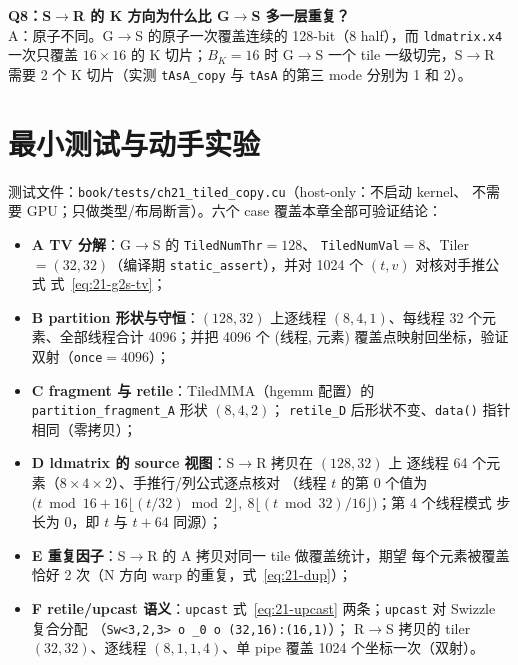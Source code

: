 \textbf{Q8：S$\to$R 的 K 方向为什么比 G$\to$S 多一层重复？}\\
A：原子不同。G$\to$S 的原子一次覆盖连续的 128-bit（8 half），而
\texttt{ldmatrix.x4} 一次只覆盖 $16\times16$ 的 K 切片；$B_K=16$ 时
G$\to$S 一个 tile 一级切完，S$\to$R 需要 2 个 K 切片（实测
\texttt{tAsA\_copy} 与 \texttt{tAsA} 的第三 mode 分别为 1 和 2）。

\section{最小测试与动手实验}

测试文件：\texttt{book/\allowbreak{}tests/\allowbreak{}ch21\_\allowbreak{}tiled\_\allowbreak{}copy.cu}（host-only：不启动 kernel、
不需要 GPU；只做类型/布局断言）。六个 case 覆盖本章全部可验证结论：

\begin{itemize}
  \item \textbf{A TV 分解}：G$\to$S 的 \texttt{TiledNumThr}$=128$、
        \texttt{TiledNumVal}$=8$、Tiler$=(32,32)$（编译期
        \texttt{static\_\allowbreak{}assert}），并对 1024 个 $(t,v)$ 对核对手推公式
        式~\eqref{eq:21-g2s-tv}；
  \item \textbf{B partition 形状与守恒}：$(128,32)$ 上逐线程
        $(8,4,1)$、每线程 32 个元素、全部线程合计 4096；并把 4096 个
        (线程, 元素) 覆盖点映射回坐标，验证双射（\texttt{once}$=4096$）；
  \item \textbf{C fragment 与 retile}：TiledMMA（hgemm 配置）的
        \texttt{partition\_\allowbreak{}fragment\_\allowbreak{}A} 形状 $(8,4,2)$；
        \texttt{retile\_D} 后形状不变、\texttt{data()} 指针相同（零拷贝）；
  \item \textbf{D ldmatrix 的 source 视图}：S$\to$R 拷贝在 $(128,32)$ 上
        逐线程 64 个元素（$8\times4\times2$）、手推行/列公式逐点核对
        （线程 $t$ 的第 0 个值为 $\bigl(t\bmod 16 + 16\lfloor (t/32)\bmod
        2\rfloor,\ 8\lfloor (t\bmod 32)/16\rfloor\bigr)$；第 4 个线程模式
        步长为 0，即 $t$ 与 $t+64$ 同源）；
  \item \textbf{E 重复因子}：S$\to$R 的 A 拷贝对同一 tile 做覆盖统计，期望
        每个元素被覆盖恰好 2 次（N 方向 warp 的重复，式~\eqref{eq:21-dup}）；
  \item \textbf{F retile/upcast 语义}：\texttt{upcast} 式~\eqref{eq:21-upcast}
        两条；\texttt{upcast} 对 Swizzle 复合分配
        （\texttt{Sw\allowbreak{}<3,\allowbreak{}2,\allowbreak{}3>\ o \_\allowbreak{}0\ o\ \allowbreak{}(32,\allowbreak{}16):\allowbreak{}(16,\allowbreak{}1)}）；
        R$\to$S 拷贝的 tiler$(32,32)$、逐线程 $(8,1,1,4)$、单 pipe 覆盖
        1024 个坐标一次（双射）。
\end{itemize}

